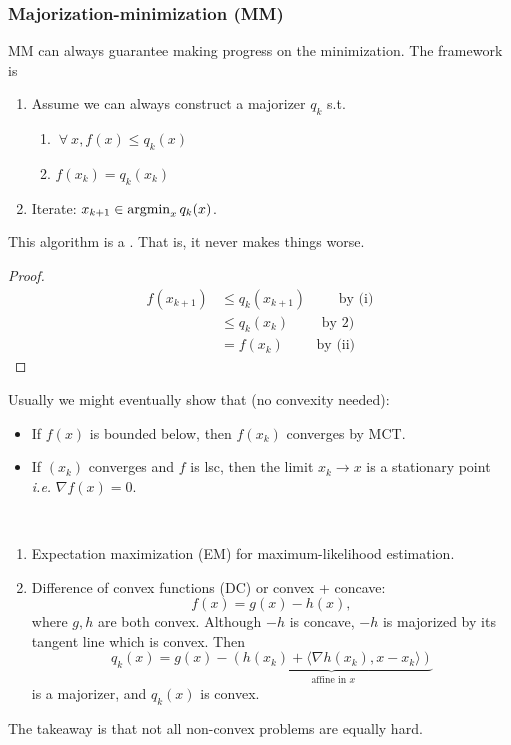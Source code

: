 \documentclass[class=article,crop=false]{standalone}
\begin{document}
\subsubsection{Majorization-minimization (MM)} 
MM can always guarantee making progress on the minimization. The framework is
\begin{enumerate}[label=\arabic*)]
	\item Assume we can always construct a majorizer $ q_k$ s.t.
		\begin{enumerate}[label=(\roman*)]
			\item $ \ \forall \ x, f(x) \leq q_k(x)$
			\item $ f(x_k) = q_k(x_k)$ 
		\end{enumerate}
	\item Iterate: $ x_{k+1} \in \operatorname*{argmin}_{x} q_k(x)$.
\end{enumerate}
This algorithm is a . That is, it never makes things worse.
\begin{proof}
\begin{align*}
	f(x_{k+1}) &\leq q_k (x_{k+1}) \qquad  \text{ by (i)} \\
		   &\leq q_k(x_k) \qquad  \text{ by 2)} \\
		   &= f(x_k) \qquad \text{ by (ii)}  
\end{align*}
\end{proof}

Usually we might eventually show that (no convexity needed):
\begin{itemize}
	\item If $ f(x)$ is bounded below, then  $ f(x_k)$ converges by MCT.
	\item If $ (x_k)$ converges and $ f$ is lsc, then the limit  $ x_k \to x$ is a stationary point \emph{i.e.} $ \nabla f(x) =0$.
\end{itemize}
\begin{eg}
	~\begin{enumerate}[label=\arabic*)]
		\item Expectation maximization (EM) for maximum-likelihood estimation.
		\item Difference of convex functions (DC) or convex + concave:
			\[
				f(x) = g(x) - h(x)
			,\]
			where $ g,h$ are both convex. Although $ -h$ is concave, $ -h$ is majorized by its tangent line which is convex. Then
			\[
				q_k(x) = g(x) - \underbrace{ (h(x_k) + \langle \nabla h(x_k),x-x_k \rangle)}_{ \text{ affine in }x } 
			\]
			is a majorizer, and $ q_k(x)$ is convex.
	\end{enumerate}
The takeaway is that not all non-convex problems are equally hard.
\end{eg}
\end{document}
